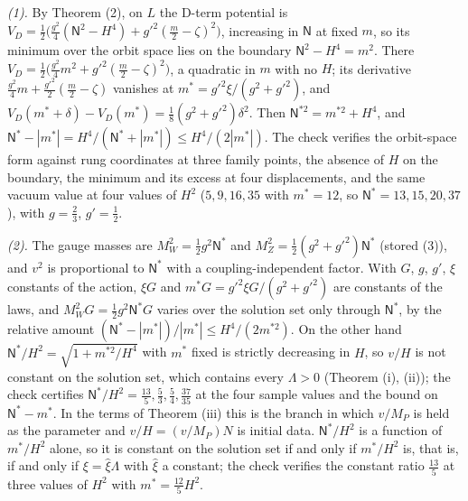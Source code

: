 \emph{(1).} By Theorem (2), on $L$ the D-term potential is $V_{D} = \tfrac12\bigl(\tfrac{g^{2}}{4}(\mathsf{N}^{2} - H^{4}) + g'^{2}(\tfrac{m}{2} - \zeta)^{2}\bigr)$, increasing in $\mathsf{N}$ at fixed $m$, so its minimum over the orbit space lies on the boundary $\mathsf{N}^{2} - H^{4} = m^{2}$. There $V_{D} = \tfrac12\bigl(\tfrac{g^{2}}{4}m^{2} + g'^{2}(\tfrac{m}{2} - \zeta)^{2}\bigr)$, a quadratic in $m$ with no $H$; its derivative $\tfrac{g^{2}}{4}m + \tfrac{g'^{2}}{2}(\tfrac{m}{2} - \zeta)$ vanishes at $m^{*} = g'^{2}\xi/(g^{2} + g'^{2})$, and $V_{D}(m^{*} + \delta) - V_{D}(m^{*}) = \tfrac18(g^{2} + g'^{2})\delta^{2}$. Then $\mathsf{N}^{*2} = m^{*2} + H^{4}$, and $\mathsf{N}^{*} - |m^{*}| = H^{4}/(\mathsf{N}^{*} + |m^{*}|) \le H^{4}/(2|m^{*}|)$. The check verifies the orbit-space form against rung coordinates at three family points, the absence of $H$ on the boundary, the minimum and its excess at four displacements, and the same vacuum value at four values of $H^{2}$ ($5, 9, 16, 35$ with $m^{*} = 12$, so $\mathsf{N}^{*} = 13, 15, 20, 37$), with $g = \tfrac23$, $g' = \tfrac12$.

\emph{(2).} The gauge masses are $M_{W}^{2} = \tfrac12 g^{2}\mathsf{N}^{*}$ and $M_{Z}^{2} = \tfrac12(g^{2} + g'^{2})\mathsf{N}^{*}$ (stored (3)), and $v^{2}$ is proportional to $\mathsf{N}^{*}$ with a coupling-independent factor. With $G$, $g$, $g'$, $\xi$ constants of the action, $\xi G$ and $m^{*}G = g'^{2}\xi G/(g^{2} + g'^{2})$ are constants of the laws, and $M_{W}^{2}G = \tfrac12 g^{2}\mathsf{N}^{*}G$ varies over the solution set only through $\mathsf{N}^{*}$, by the relative amount $(\mathsf{N}^{*} - |m^{*}|)/|m^{*}| \le H^{4}/(2m^{*2})$. On the other hand $\mathsf{N}^{*}/H^{2} = \sqrt{1 + m^{*2}/H^{4}}$ with $m^{*}$ fixed is strictly decreasing in $H$, so $v/H$ is not constant on the solution set, which contains every $\Lambda > 0$ (Theorem (i), (ii)); the check certifies $\mathsf{N}^{*}/H^{2} = \tfrac{13}{5}, \tfrac53, \tfrac54, \tfrac{37}{35}$ at the four sample values and the bound on $\mathsf{N}^{*} - m^{*}$. In the terms of Theorem (iii) this is the branch in which $v/M_{P}$ is held as the parameter and $v/H = (v/M_{P})N$ is initial data. $\mathsf{N}^{*}/H^{2}$ is a function of $m^{*}/H^{2}$ alone, so it is constant on the solution set if and only if $m^{*}/H^{2}$ is, that is, if and only if $\xi = \hat{\xi}\Lambda$ with $\hat{\xi}$ a constant; the check verifies the constant ratio $\tfrac{13}{5}$ at three values of $H^{2}$ with $m^{*} = \tfrac{12}{5}H^{2}$.

